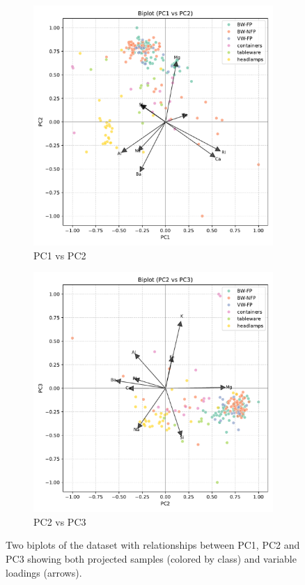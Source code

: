 \documentclass[dtu]{dtuarticle}
\begin{document}
	\begin{figure}
		\centering
		\begin{subfigure}{0.49\textwidth}
			\includegraphics[width=\linewidth]{figures/pca_biplot_pc1_pc2.pdf}
			\caption{PC1 vs PC2}
			\label{fig:biplot_pc1_pc2}
		\end{subfigure}
		\hfill
		\begin{subfigure}{0.49\textwidth}
			\includegraphics[width=\linewidth]{figures/pca_biplot_pc2_pc3.pdf}
			\caption{PC2 vs PC3}
			\label{fig:biplot_pc1_pc3}
		\end{subfigure}
		\caption{Two biplots of the dataset with relationships between PC1, PC2 and PC3 showing both projected samples (colored by class) and variable loadings (arrows).}
		\label{fig:biplots}
	\end{figure}
\end{document}
